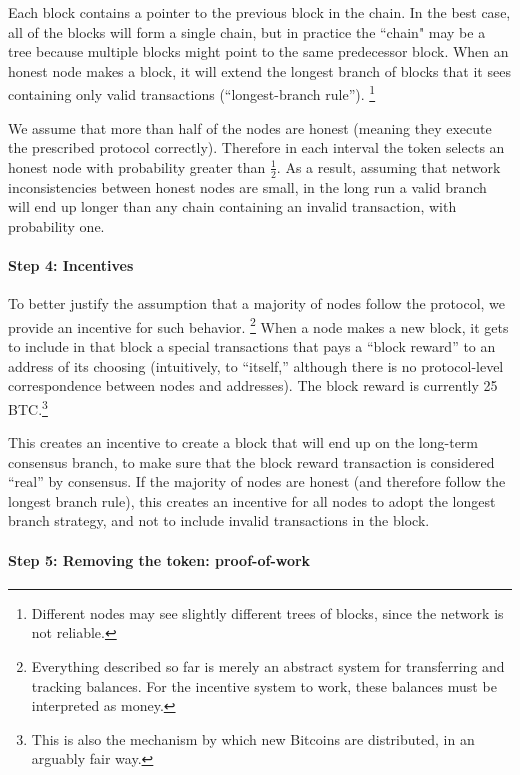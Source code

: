  
Each block contains a pointer to the previous block in the chain. In the best case, all of the blocks will form a single chain, but in practice the ``chain" may be a tree because multiple blocks might point to the same predecessor block.  When an honest node makes a block, it will extend the longest branch of blocks that it sees containing only valid transactions (``longest-branch rule''). \footnote{Different nodes may see slightly different trees of blocks, since the network is not reliable.}
 

We assume that more than half of the nodes are honest (meaning they execute the prescribed protocol correctly). Therefore in each interval the token selects an honest node with probability greater than $\frac{1}{2}$. As a result, assuming that network inconsistencies between honest nodes are small, in the long run a 
valid branch will end up longer than any chain containing an invalid transaction, with probability one. 

\paragraph{Step 4: Incentives}


To better justify the assumption that a majority of nodes follow the protocol, we provide an incentive for such behavior. 
\footnote{Everything described so far is merely an abstract system for transferring and tracking balances. For the incentive system to work, these balances must be interpreted as money.}
When a node makes a new block, it gets to include in that block a special transactions that pays a ``block reward'' to an address of its choosing (intuitively, to ``itself,'' although there is no protocol-level correspondence between nodes and addresses).  The block reward is currently 25 BTC.\footnote{This is also the mechanism by which new Bitcoins are distributed, in an arguably fair way.}
 

This creates an incentive to create a block that will end up on the long-term consensus branch, to make sure that the block reward transaction is considered ``real'' by consensus. If the majority of nodes are honest (and therefore follow the longest branch rule), this creates an incentive for all nodes to adopt the longest branch strategy, and not to include invalid transactions in the block. 



\paragraph{Step 5: Removing the token: proof-of-work}

